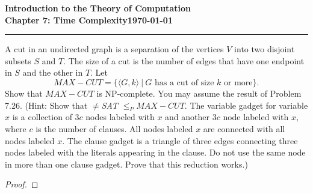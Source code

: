 \documentclass[11pt]{article}
\newcommand{\dated}{\today}
\begin{document}
\textbf{Introduction to the Theory of
Computation}\hfill\textbf{\myname}\\[0.01in]
\textbf{Chapter 7: Time Complexity}\hfill\textbf{\dated}\\
\smallskip\hrule\bigskip

\begin{problem}{7.27}
A cut in an undirected graph is a separation of the vertices $V$ into two disjoint
subsets $S$ and $T$. The size of a cut is the number of edges that have one endpoint
in $S$ and the other in $T$. Let
\[
MAX-CUT = \{\langle G, k \rangle \ | \ G \text{ has a cut of size } k \text{ or more}\}.
\]
Show that $MAX-CUT$ is NP-complete. You may assume the result of Problem 7.26. (Hint: Show that $\neq$\textit{SAT} $\leq_P MAX-CUT$. The variable gadget for
variable $x$ is a collection of $3c$ nodes labeled with $x$ and another $3c$ node labeled with $x$, where $c$ is the number of clauses. All nodes labeled $x$ are connected with all nodes labeled $x$. The clause gadget is a triangle of three edges connecting three nodes labeled with the literals appearing in the clause. Do not use the same node in more than one clause gadget. Prove that this reduction works.)
\end{problem} 

\begin{proof}
\end{proof}
\end{document}
